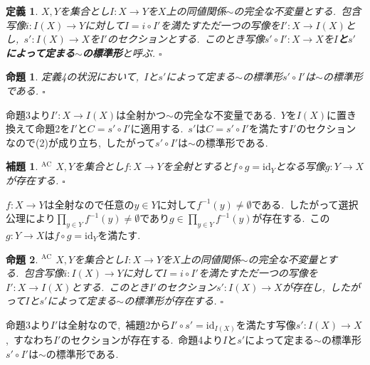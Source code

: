 \documentclass[uplatex,dvipdfmx]{jsarticle}
\makeatletter
\theoremstyle{noperiod}
\newtheorem{definition}{定義}
\newtheorem{proposition}{命題}
\newtheorem{lemma}{補題}
\renewenvironment{proof}[1][\proofname]{\par
  \pushQED{\qed}
  \normalfont \topsep6\p@\@plus6\p@\relax
  \trivlist
  \item[\hskip\labelsep
        \itshape
    #1 ]\ignorespaces
}{
  \popQED\endtrivlist\@endpefalse
}
\renewcommand{\proofname}{\bfseries 証明}
\makeatother
\begin{document}
\begin{definition}
$X,Y$を集合とし$I \colon X \to Y$を$X$上の同値関係$\sim$の完全な不変量とする.\ 包含写像$i \colon I(X) \to Y$に対して$I = i \circ I'$を満たすただ一つの写像を$I' \colon X \to I(X)$とし,\ $s' \colon I(X) \to X$を$I'$のセクションとする.\ このとき写像$s' \circ I' \colon X \to X$を\textbf{$I$と$s'$によって定まる$\sim$の標準形}と呼ぶ.
\hfill $\square$
\end{definition}

\begin{proposition}
定義4の状況において,\ $I$と$s'$によって定まる$\sim$の標準形$s' \circ I'$は$\sim$の標準形である.
\hfill $\square$
\end{proposition}

\begin{proof}
命題3より$I' \colon X \to I(X)$は全射かつ$\sim$の完全な不変量である.\ $Y$を$I(X)$に置き換えて命題2を$I'$と$C = s' \circ I'$に適用する.\ $s'$は$C = s' \circ I'$を満たす$I'$のセクションなので(2)が成り立ち,\ したがって$s' \circ I'$は$\sim$の標準形である.
\end{proof}

\begin{lemma}\hspace{-0.7em}$^{\textrm{AC}}$\hspace{0.2em}
$X,Y$を集合とし$f \colon X \to Y$を全射とすると$f \circ g = \mathrm{id}_Y$となる写像$g \colon Y \to X$が存在する.
\hfill $\square$
\end{lemma}

\begin{proof}
$f \colon X \to Y$は全射なので任意の$y \in Y$に対して$f^{-1}(y) \neq \emptyset$である.\ したがって選択公理により$\prod_{y \in Y}f^{-1}(y) \neq \emptyset$であり$g \in \prod_{y \in Y}f^{-1}(y)$が存在する.\ この$g \colon Y \to X$は$f \circ g = \mathrm{id}_Y$を満たす.
\end{proof}

\begin{proposition}\hspace{-0.7em}$^{\textrm{AC}}$\hspace{0.2em}
$X,Y$を集合とし$I \colon X \to Y$を$X$上の同値関係$\sim$の完全な不変量とする.\ 包含写像$i \colon I(X) \to Y$に対して$I = i \circ I'$を満たすただ一つの写像を$I' \colon X \to I(X)$とする.\ このとき$I'$のセクション$s' \colon I(X) \to X$が存在し,\ したがって$I$と$s'$によって定まる$\sim$の標準形が存在する.
\hfill $\square$
\end{proposition}

\begin{proof}
命題3より$I'$は全射なので,\ 補題2から$I' \circ s' = \mathrm{id}_{I(X)}$を満たす写像$s' \colon I(X) \to X$,\ すなわち$I'$のセクションが存在する.\ 命題4より$I$と$s'$によって定まる$\sim$の標準形$s' \circ I'$は$\sim$の標準形である.
\end{proof}
\end{document}
